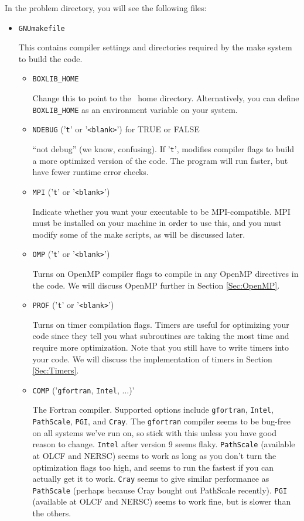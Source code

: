 In the problem directory, you will see the following files:
\begin{itemize}
\item {\tt GNUmakefile}

This contains compiler settings and directories required by the make system to build the code.

  \begin{itemize}

    \item {\tt BOXLIB\_HOME}

    Change this to point to the \BoxLib\ home directory.  Alternatively, you can define {\tt BOXLIB\_HOME}
    as an environment variable on your system.

    \item {\tt NDEBUG} ('{\tt t}' or '{\tt <blank>}') for TRUE or FALSE
      
    ``not debug'' (we know, confusing).  If '{\tt t}', modifies compiler flags to build a 
    more optimized version of the code.  The program will run faster, but have fewer 
    runtime error checks.

    \item {\tt MPI} ('{\tt t}' or '{\tt <blank>}')

    Indicate whether you want your executable to be MPI-compatible.  MPI must be installed on your
    machine in order to use this, and you must modify some of the make scripts, as will be 
    discussed later.

    \item {\tt OMP} ('{\tt t}' or '{\tt <blank>}')

    Turns on OpenMP compiler flags to compile in any OpenMP directives in the code.
    We will discuss OpenMP further in Section \ref{Sec:OpenMP}.

    \item {\tt PROF} ('{\tt t}' or '{\tt <blank>}')

    Turns on timer compilation flags.  Timers are useful for optimizing your code since they tell you 
    what subroutines are taking the most time and require more optimization.  Note that you still have 
    to write timers into your code.  We will discuss the implementation of timers in Section \ref{Sec:Timers}.

    \item {\tt COMP} ('{\tt gfortran}, {\tt Intel}, $\ldots$)'

    The Fortran compiler.  Supported options include {\tt gfortran}, {\tt Intel}, 
    {\tt PathScale}, {\tt PGI}, and {\tt Cray}.  The {\tt gfortran} compiler seems to be 
    bug-free on all systems we've run on, so stick with this unless you have good reason to 
    change.  {\tt Intel} after version 9 seems flaky.  {\tt PathScale} (available 
    at OLCF and NERSC) seems to work as long as you don't turn the optimization flags 
    too high, and seems to run the fastest if you can actually get it to work.  
    {\tt Cray} seems to give similar performance as {\tt PathScale} (perhaps
    because Cray bought out PathScale recently).  {\tt PGI} (available at OLCF and NERSC) 
    seems to work fine, but is slower than the others.


\end{itemize}
\end{itemize}

